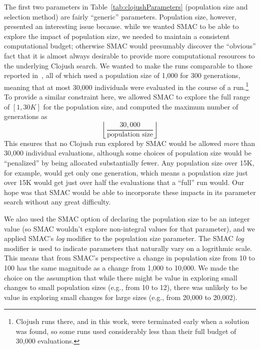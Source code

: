 The first two parameters in Table~\ref{tab:clojushParameters} (population size
and selection method) are fairly ``generic'' parameters. Population size, 
however, presented an interesting issue because. while we wanted SMAC to be able to
explore the impact of population size, we needed to maintain a consistent
computational budget; otherwise SMAC would presumably discover the ``obvious''
fact that it is almost always desirable to provide more computational resources to the underlying Clojush search. We wanted to make the runs comparable to those
reported in~\cite{Helmuth:2015:GECCO}, all of which used a population size of
1,000 for 300 generations, meaning that at most 30,000 individuals were evaluated 
in the course of a run.\footnote{Clojush runs there, and in this work, 
	were terminated early when a solution was found, so some runs used
	considerably less than their full budget of 30,000 evaluations.} To provide
a similar constraint here, we allowed SMAC to explore the full range of 
$[1, 30K]$ for the population size, and computed the maximum number of
generations as
\[
	\left \lfloor{\frac{30,000}{\textrm{population size}}}\right \rfloor
\]
This ensures that no Clojush run explored by SMAC would be allowed 
\emph{more} than 30,000 individual evaluations, although some choices of 
population size would be ``penalized'' by being allocated substantially fewer. 
Any population size over 15K, for example, would get only one generation, which 
means a population size just over 15K would get just over half the evaluations 
that a ``full'' run would. Our hope was that SMAC would be able to incorporate
these impacts in its parameter search without any great difficulty.

We also used the SMAC option of declaring the population size to be an
integer value (so SMAC wouldn't explore non-integral values for that parameter),
and we applied SMAC's \emph{log} modifier to the population size parameter.
The SMAC \emph{log} modifier is used to indicate parameters that naturally
vary on a logrithmic scale. This means that from SMAC's perspective a change
in population size from 10 to 100 has the same magnitude as a change from 1,000 to
10,000. We made the choice on the assumption that while there might be value
in exploring small changes to small population sizes (e.g., from 10 to 12),
there was unlikely to be value in exploring small changes for large sizes
(e.g., from 20,000 to 20,002).

